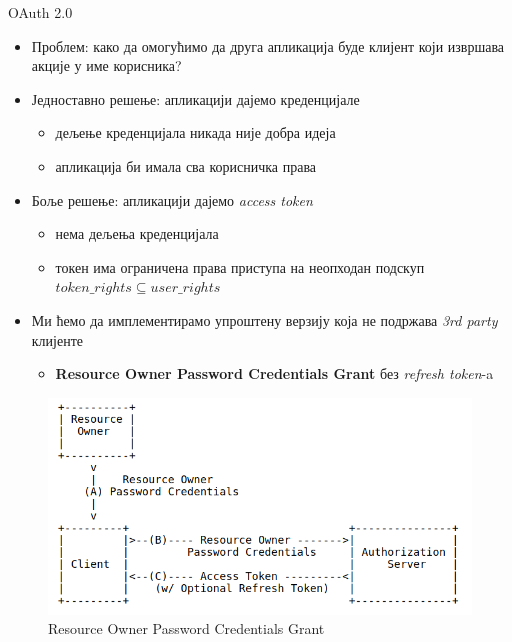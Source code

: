 \documentclass{beamer}
\begin{document}
    \begin{frame}[allowframebreaks]{OAuth 2.0}
        \begin{itemize}
            \item Проблем: како да омогућимо да друга апликација буде клијент који извршава акције у име корисника?
            \item Једноставно решење: апликацији дајемо креденцијале
            \begin{itemize}
                \item дељење креденцијала никада није добра идеја
                \item апликација би имала сва корисничка права
            \end{itemize}
            \item Боље решење: апликацији дајемо \textit{access token}
            \begin{itemize}
                \item нема дељења креденцијала
                \item токен има ограничена права приступа на неопходан подскуп \begin{math}token\_rights \subseteq user\_rights\end{math}
            \end{itemize}
            \item Ми ћемо да имплементирамо упроштену верзију која не подржава \textit{3rd party} клијенте
            \begin{itemize}
                \item \textbf{Resource Owner Password Credentials Grant} без \textit{refresh token}-a
            \end{itemize}
        \end{itemize}
        
        \framebreak
        
        \begin{figure}
            \centering
            \includegraphics[width=\textwidth,height=\textheight,keepaspectratio]{images/oauth.png}
            \caption{Resource Owner Password Credentials Grant}
            \label{fig:oauth}
        \end{figure}
    \end{frame}
    
\end{document}
